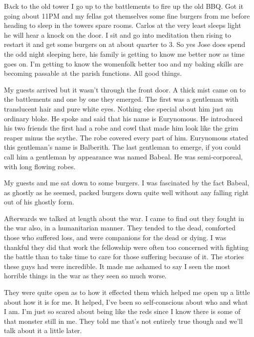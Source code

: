 \lettrine[lines=2,lraise=0]{B}ack to the old tower I go up to the battlements to fire up the old BBQ. Got it going about 11PM and my fellas got themselves some fine burgers from me before heading to sleep in the towers spare rooms. Carlos at the very least sleeps light he will hear a knock on the door. I sit and go into meditation then rising to restart it and get some burgers on at about quarter to 3. So yes Jose does spend the odd night sleeping here, his family is getting to know me better now as time goes on. I'm getting to know the womenfolk better too and my baking skills are becoming passable at the parish functions. All good things.

My guests arrived but it wasn't through the front door. A thick mist came on to the battlements and one by one they emerged. The first was a gentleman with translucent hair and pure white eyes. Nothing else special about him just an ordinary bloke. He spoke and said that his name is Eurynomous. He introduced his two friends the first had a robe and cowl that made him look like the grim reaper minus the scythe. The robe covered every part of him. Eurynomous stated this gentleman's name is Balberith. The last gentleman to emerge, if you could call him a gentleman by appearance was named Babeal. He was semi-corporeal, with long flowing robes.

My guests and me sat down to some burgers. I was fascinated by the fact Babeal, as ghostly as he seemed, packed burgers down quite well without any falling right out of his ghostly form.

Afterwards we talked at length about the war. I came to find out they fought in the war also, in a humanitarian manner. They tended to the dead, comforted those who suffered loss, and were companions for the dead or dying. I was thankful they did that work the fellowship were often too concerned with fighting the battle than to take time to care for those suffering because of it. The stories these guys had were incredible. It made me ashamed to say I seen the most horrible things in the war as they seen so much worse.

They were quite open as to how it effected them which helped me open up a little about how it is for me. It helped, I've been so self-conscious about who and what I am. I'm just so scared about being like the reds since I know there is some of that monster still in me. They told me that's not entirely true though and we'll talk about it a little later.

